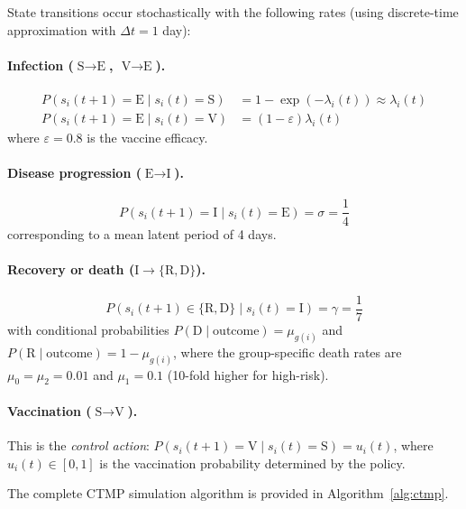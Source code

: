 State transitions occur stochastically with the following rates (using discrete-time
approximation with $\Delta t = 1$ day):

\paragraph{Infection ($\text{S} \to \text{E}$, $\text{V} \to \text{E}$).}
\begin{align}
P(s_i(t+1) = \text{E} \mid s_i(t) = \text{S}) &= 1 - \exp(-\lambda_i(t)) \approx \lambda_i(t) \\
P(s_i(t+1) = \text{E} \mid s_i(t) = \text{V}) &= (1-\varepsilon)\lambda_i(t)
\end{align}
where $\varepsilon = 0.8$ is the vaccine efficacy.

\paragraph{Disease progression ($\text{E} \to \text{I}$).}
\begin{equation}
P(s_i(t+1) = \text{I} \mid s_i(t) = \text{E}) = \sigma = \frac{1}{4}
\end{equation}
corresponding to a mean latent period of 4 days.

\paragraph{Recovery or death ($\text{I} \to \{\text{R}, \text{D}\}$).}
\begin{equation}
P(s_i(t+1) \in \{\text{R}, \text{D}\} \mid s_i(t) = \text{I}) = \gamma = \frac{1}{7}
\end{equation}
with conditional probabilities $P(\text{D} \mid \text{outcome}) = \mu_{g(i)}$ and
$P(\text{R} \mid \text{outcome}) = 1 - \mu_{g(i)}$, where the group-specific
death rates are $\mu_0 = \mu_2 = 0.01$ and $\mu_1 = 0.1$ (10-fold higher for high-risk).

\paragraph{Vaccination ($\text{S} \to \text{V}$).}
This is the \emph{control action}: $P(s_i(t+1) = \text{V} \mid s_i(t) = \text{S}) = u_i(t)$,
where $u_i(t) \in [0,1]$ is the vaccination probability determined by the policy.

The complete CTMP simulation algorithm is provided in Algorithm~\ref{alg:ctmp}.

